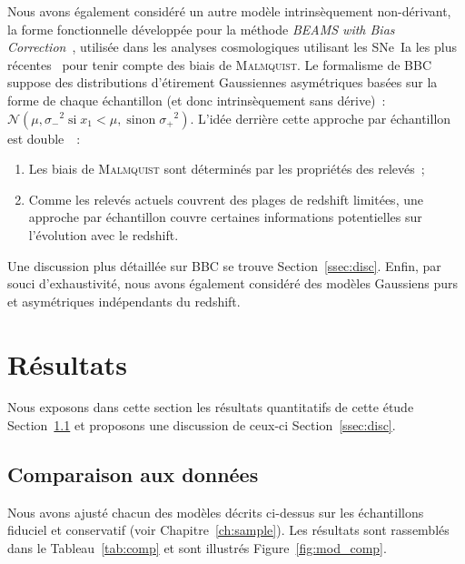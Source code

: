 \documentclass[../main/main.tex]{subfiles}
\begin{document}
Nous avons également considéré un autre modèle intrinsèquement non-dérivant, la
forme fonctionnelle développée pour la méthode \textit{BEAMS with Bias
Correction}~\citep[BBC,][]{scolnic2016, kessler2017}, utilisée dans les analyses
cosmologiques utilisant les SNe~Ia les plus récentes~\citep[par
exemple][]{scolnic2018, abbott2019, riess2016, riess2019} pour tenir compte des
biais de \textsc{Malmquist}. Le formalisme de BBC suppose des distributions
d'étirement Gaussiennes asymétriques basées sur la forme de chaque échantillon
(et donc intrinsèquement sans dérive)~: $\mathcal{N}\left(\mu, \sigma_-{}^2\;
\text{si} \;x_1<\mu,\; \text{sinon} \;\sigma_+{}^2\right)$. L'idée derrière
cette approche par échantillon est double~\citep{scolnic2016, scolnic2018}~:
\begin{enumerate}
    \item Les biais de \textsc{Malmquist} sont déterminés par les propriétés des
        relevés~;
    \item Comme les relevés actuels couvrent des plages de redshift limitées,
        une approche par échantillon couvre certaines informations potentielles
        sur l'évolution avec le redshift.
\end{enumerate}
Une discussion plus détaillée sur BBC se trouve Section~\ref{ssec:disc}. Enfin,
par souci d'exhaustivité, nous avons également considéré des modèles Gaussiens
purs et asymétriques indépendants du redshift.

\section{Résultats}\label{sec:xres}

Nous exposons dans cette section les résultats quantitatifs de cette étude
Section~\ref{ssec:xcomp} et proposons une discussion de ceux-ci
Section~\ref{ssec:disc}.

\subsection{Comparaison aux données}\label{ssec:xcomp}
Nous avons ajusté chacun des modèles décrits ci-dessus sur les échantillons
fiduciel et conservatif (voir Chapitre~\ref{ch:sample}). Les résultats sont
rassemblés dans le Tableau~\ref{tab:comp} et sont illustrés
Figure~\ref{fig:mod_comp}.
\end{document}
